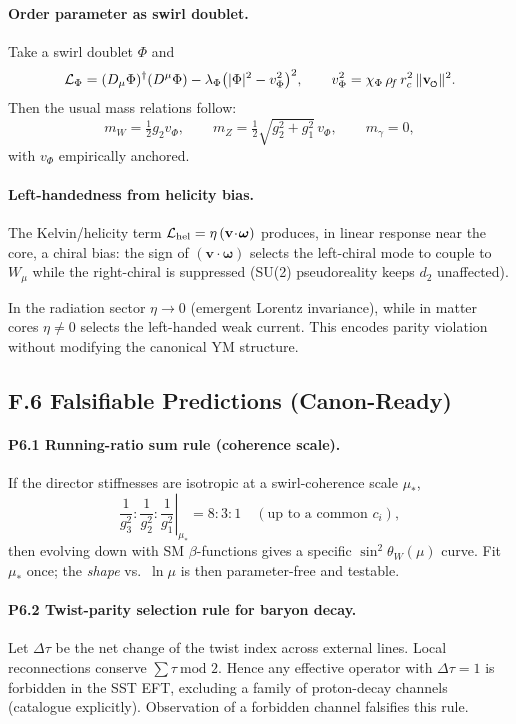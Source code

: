 \documentclass[11pt]{article}
\begin{document}
\paragraph{Order parameter as swirl doublet.}
Take a swirl doublet $\Phi$ and
\[
\mathcal L_\Phi=(D_\mu \Phi)^\dagger (D^\mu \Phi)-\lambda_\Phi\big(|\Phi|^2-v_\Phi^2\big)^2,
\qquad
v_\Phi^2=\chi_\Phi\,\rho_{\!f}\,r_c^2\,\lVert \vswirl\rVert^2.
\]
Then the usual mass relations follow:
\[
m_W=\tfrac12 g_2 v_\Phi,\qquad
m_Z=\tfrac12\sqrt{g_2^2+g_1^2}\,v_\Phi,\qquad
m_\gamma=0,
\]
with $v_\Phi$ empirically anchored\cite{Weinberg1967,EnglertBrout1964,Higgs1964}.

\paragraph{Left-handedness from helicity bias.}
The Kelvin/helicity term $\mathcal L_{\rm hel}=\eta\,(\mathbf v\!\cdot\!\boldsymbol\omega)$ produces, in linear response near the core, a chiral bias: the sign of $(\mathbf v\!\cdot\!\boldsymbol\omega)$ selects the left-chiral mode to couple to $W_\mu$ while the right-chiral is suppressed (SU(2) pseudoreality keeps $d_2$ unaffected)\cite{Witten1982}.
\begin{definition}
In the radiation sector $\eta\!\to\!0$ (emergent Lorentz invariance), while in matter cores $\eta\!\neq\!0$ selects the left-handed weak current. This encodes parity violation without modifying the canonical YM structure.
\end{definition}

\subsection*{F.6 Falsifiable Predictions (Canon-Ready)}

\paragraph{P6.1 Running-ratio sum rule (coherence scale).}
If the director stiffnesses are isotropic at a swirl-coherence scale $\mu_\ast$,
\[
\left.
\frac{1}{g_3^2}:\frac{1}{g_2^2}:\frac{1}{g_1^2}
\right|_{\mu_\ast}
= 8:3:1\quad (\text{up to a common }c_i),
\]
then evolving down with SM $\beta$-functions gives a specific $\sin^2\theta_W(\mu)$ curve. Fit $\mu_\ast$ once; the \emph{shape} vs.\ $\ln\mu$ is then parameter-free and testable\cite{PDG2024}.

\paragraph{P6.2 Twist-parity selection rule for baryon decay.}
Let $\Delta\tau$ be the net change of the twist index across external lines. Local reconnections conserve $\sum \tau\ \text{mod }2$. Hence any effective operator with $\Delta\tau=1$ is forbidden in the SST EFT, excluding a family of proton-decay channels (catalogue explicitly). Observation of a forbidden channel falsifies this rule.
\end{document}
